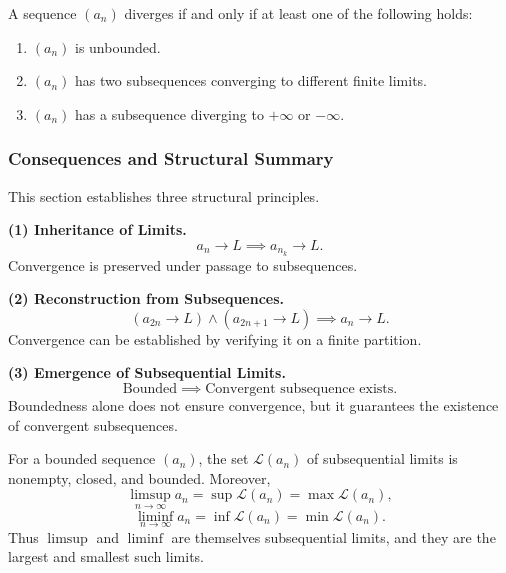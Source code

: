 \begin{theorem}
A sequence $(a_n)$ diverges if and only if at least one of the following holds:
\begin{enumerate}
\item $(a_n)$ is unbounded.
\item $(a_n)$ has two subsequences converging to different finite limits.
\item $(a_n)$ has a subsequence diverging to $+\infty$ or $-\infty$.
\end{enumerate}
\end{theorem}



\subsubsection{Consequences and Structural Summary}

This section establishes three structural principles.

\medskip

\textbf{(1) Inheritance of Limits.}
\[
a_n \to L \implies a_{n_k} \to L.
\]
Convergence is preserved under passage to subsequences.

\medskip

\textbf{(2) Reconstruction from Subsequences.}
\[
(a_{2n} \to L) \land (a_{2n+1} \to L) \implies a_n \to L.
\]
Convergence can be established by verifying it on a finite partition.

\medskip

\textbf{(3) Emergence of Subsequential Limits.}
\[
\text{Bounded} \implies \text{Convergent subsequence exists}.
\]
Boundedness alone does not ensure convergence,
but it guarantees the existence of convergent subsequences.

\medskip

\begin{remark}
For a bounded sequence $(a_n)$, the set $\mathcal{L}(a_n)$ of subsequential
limits is nonempty, closed, and bounded. Moreover,
\[
\limsup_{n \to \infty} a_n = \sup \mathcal{L}(a_n) = \max \mathcal{L}(a_n),
\]
\[
\liminf_{n \to \infty} a_n = \inf \mathcal{L}(a_n) = \min \mathcal{L}(a_n).
\]
Thus $\limsup$ and $\liminf$ are themselves subsequential limits,
and they are the largest and smallest such limits.
\end{remark}

